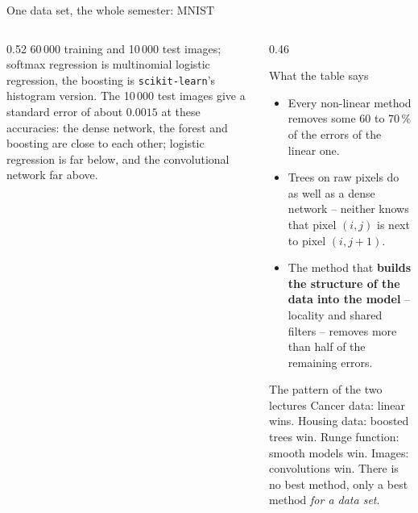 \documentclass[10pt,aspectratio=169]{beamer}
\begin{document}
\begin{frame}{One data set, the whole semester: MNIST}
\begin{columns}[T]
\begin{column}{0.52\textwidth}
\medskip
\footnotesize
60\,000 training and 10\,000 test images; softmax regression is
multinomial logistic regression, the boosting is \texttt{scikit-learn}'s
histogram version.  The 10\,000 test images give a standard error of about $0.0015$ at these
accuracies: the dense network, the forest and boosting are close to each
other; logistic regression is far below, and the convolutional network far
above.
\end{column}
\begin{column}{0.46\textwidth}
\small
\begin{block}{What the table says}
\footnotesize
\begin{itemize}
  \item Every non-linear method removes some 60 to 70\,\% of the errors of
    the linear one.
  \item Trees on raw pixels do as well as a dense network -- neither knows
    that pixel $(i,j)$ is next to pixel $(i,j+1)$.
  \item The method that \textbf{builds the structure of the data into the
    model} -- locality and shared filters -- removes more than half of the
    remaining errors.
\end{itemize}
\end{block}
\begin{block}{The pattern of the two lectures}
\footnotesize
Cancer data: linear wins.  Housing data: boosted trees win.  Runge
function: smooth models win.  Images: convolutions win.  There is no best
method, only a best method \emph{for a data set}.
\end{block}
\end{column}
\end{columns}
\end{frame}
\end{document}

